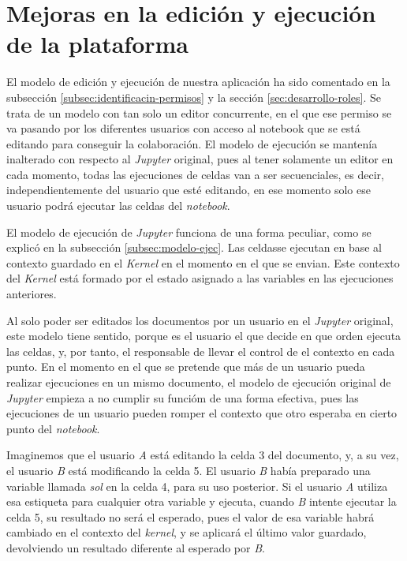 \documentclass[11pt,spanish,listoffigures]{tfgetsinf}
\begin{document}

\section{Mejoras en la edición y ejecución de la plataforma}
\label{sec:mejoras-ejec}

El modelo de edición y ejecución de nuestra aplicación ha sido comentado en la subsección \ref{subsec:identificacin-permisos} y la sección \ref{sec:desarrollo-roles}. Se trata de un modelo con tan solo un editor concurrente, en el que ese permiso se va pasando por los diferentes usuarios con acceso al notebook que se está editando para conseguir la colaboración. El modelo de ejecución se mantenía inalterado con respecto al \textit{Jupyter} original, pues al tener solamente un editor en cada momento, todas las ejecuciones de celdas van a ser secuenciales, es decir, independientemente del usuario que esté editando, en ese momento solo ese usuario podrá ejecutar las celdas del \textit{notebook}.

El modelo de ejecución de \textit{Jupyter} funciona de una forma peculiar, como se explicó en la subsección \ref{subsec:modelo-ejec}. Las celdasse ejecutan en base al contexto guardado en el \textit{Kernel} en el momento en el que se envian. Este contexto del \textit{Kernel} está formado por el estado asignado a las variables en las ejecuciones anteriores. 

Al solo poder ser editados los documentos por un usuario en el \textit{Jupyter} original, este modelo tiene sentido, porque es el usuario el que decide en que orden ejecuta las celdas, y, por tanto, el  responsable de llevar el control de el contexto en cada punto. En el momento en el que se pretende que más de un usuario pueda realizar ejecuciones en un mismo documento, el modelo de ejecución original de \textit{Jupyter} empieza a no cumplir su funcióm de una forma efectiva, pues las ejecuciones de un usuario pueden romper el contexto que otro esperaba en cierto punto del \textit{notebook}.

Imaginemos que el usuario \textit{A} está editando la celda 3 del documento, y, a su vez, el usuario \textit{B} está modificando la celda 5. El usuario \textit{B} había preparado una variable llamada \textit{sol} en la celda 4, para su uso posterior. Si el usuario \textit{A} utiliza esa estiqueta para cualquier otra variable y ejecuta, cuando \textit{B} intente ejecutar la celda 5, su resultado no será el esperado, pues el valor de esa variable habrá cambiado en el contexto del \textit{kernel}, y se aplicará el último valor guardado, devolviendo un resultado diferente al esperado por \textit{B}.
\end{document}
